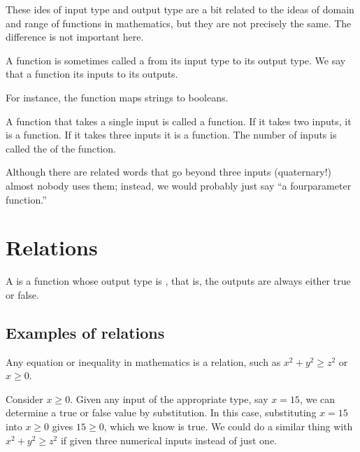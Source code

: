 \documentclass[letterpaper,10pt,english]{jupyterBook}
\begin{document}
\sphinxAtStartPar
These ides of input type and output type are a bit related to the ideas of domain and range of functions in mathematics, but they are not precisely the same.  The difference is not important here.

\sphinxAtStartPar
{} A function is sometimes called a  from its input type to its output type.  We say that a function  its inputs to its outputs.

\sphinxAtStartPar
For instance, the  function maps strings to booleans.

\sphinxAtStartPar
{} A function that takes a single input is called a  function.  If it takes two inputs, it is a  function.  If it takes three inputs it is a  function.  The number of inputs is called the  of the function.

\sphinxAtStartPar
Although there are related words that go beyond three inputs (quaternary!) almost nobody uses them; instead, we would probably just say “a four\sphinxhyphen{}parameter function.”


\section{Relations}
\label{\detokenize{chapter-2-mathematical-foundations:relations}}
\sphinxAtStartPar
{} A  is a function whose output type is , that is, the outputs are always either true or false.


\subsection{Examples of relations}
\label{\detokenize{chapter-2-mathematical-foundations:examples-of-relations}}
\sphinxAtStartPar
{} Any equation or inequality in mathematics is a relation, such as \(x^2+y^2\ge z^2\) or \(x\ge 0\).

\sphinxAtStartPar
Consider \(x\ge 0\).  Given any input of the appropriate type, say \(x=15\), we can determine a true or false value by substitution.  In this case, substituting \(x=15\) into \(x\ge0\) gives \(15\ge0\), which we know is true.  We could do a similar thing with \(x^2+y^2\ge z^2\) if given three numerical inputs instead of just one.
\end{document}
